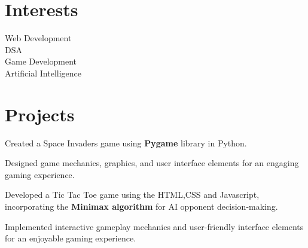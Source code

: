 \documentclass[14pt]{deedy-resume-openfont}
\begin{document}
\begin{minipage}[t]{0.33\textwidth}
    \section{Interests}
    \textbullet{} Web Development \\ 
    \textbullet{} DSA \\ 
    \textbullet{} Game Development \\ 
    \textbullet{} Artificial Intelligence
    \sectionsep

\end{minipage}
\hfill
\hfill
\begin{minipage}[t]{0.66\textwidth}

    \section{Projects}



    \vspace{6pt}
    \begin{tightemize}
    \vspace{4pt}
        \item Created a Space Invaders game using {\bf Pygame} library in Python.        
        \item Designed game mechanics, graphics, and user interface elements for an engaging gaming experience.
    \end{tightemize}
    \sectionsep


    \begin{tightemize}
        \item Developed a Tic Tac Toe game using the HTML,CSS and Javascript, incorporating the {\bf Minimax algorithm} for AI opponent decision-making. 
        \item Implemented interactive gameplay mechanics and user-friendly interface elements for an enjoyable gaming experience.
    \end{tightemize}
    \sectionsep



\end{minipage}
\end{document}
